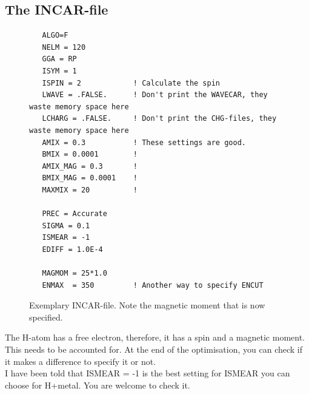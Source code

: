 \documentclass[11pt,oneside,a4paper, captions=nooneline, headsepline]{article}%
\begin{document}
\subsection{The INCAR-file}
\begin{figure}[h!!]
\begin{verbatim}
   ALGO=F
   NELM = 120
   GGA = RP
   ISYM = 1
   ISPIN = 2			! Calculate the spin
   LWAVE = .FALSE.		! Don't print the WAVECAR, they waste memory space here
   LCHARG = .FALSE.		! Don't print the CHG-files, they waste memory space here
   AMIX = 0.3			! These settings are good.
   BMIX = 0.0001		!
   AMIX_MAG = 0.3		!
   BMIX_MAG = 0.0001	!
   MAXMIX = 20			!

   PREC = Accurate
   SIGMA = 0.1
   ISMEAR = -1
   EDIFF = 1.0E-4

   MAGMOM = 25*1.0
   ENMAX  = 350			! Another way to specify ENCUT
\end{verbatim}
\caption{Exemplary INCAR-file. Note the magnetic moment that is now specified.}
\label{cin}
\end{figure}
The H-atom has a free electron, therefore, it has a spin and a magnetic moment. This needs to be accounted for. At the end of the optimisation, you can check if it makes a difference to specify it or not.\\
I have been told that ISMEAR = -1 is the best setting for ISMEAR you can choose for H+metal. You are welcome to check it.\\
\end{document}
